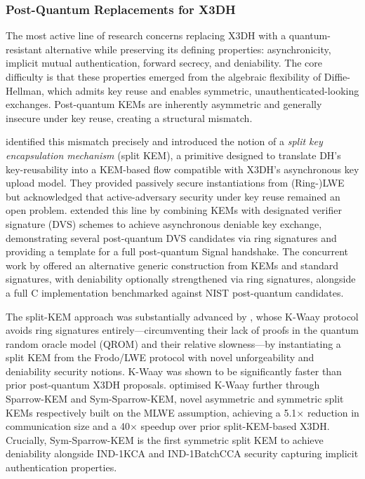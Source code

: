 \subsubsection{Post-Quantum Replacements for X3DH}

The most active line of research concerns replacing X3DH with a quantum-resistant alternative while preserving its defining properties: asynchronicity, implicit mutual authentication, forward secrecy, and deniability. The core difficulty is that these properties emerged from the algebraic flexibility of Diffie-Hellman, which admits key reuse and enables symmetric, unauthenticated-looking exchanges. Post-quantum KEMs are inherently asymmetric and generally insecure under key reuse, creating a structural mismatch.

\textcite{brendel2021} identified this mismatch precisely and introduced the notion of a \emph{split key encapsulation mechanism} (split KEM), a primitive designed to translate DH's key-reusability into a KEM-based flow compatible with X3DH's asynchronous key upload model. They provided passively secure instantiations from (Ring-)LWE but acknowledged that active-adversary security under key reuse remained an open problem. \textcite{brendel2022} extended this line by combining KEMs with designated verifier signature (DVS) schemes to achieve asynchronous deniable key exchange, demonstrating several post-quantum DVS candidates via ring signatures and providing a template for a full post-quantum Signal handshake. The concurrent work by \textcite{hashimoto2021,hashimoto2022} offered an alternative generic construction from KEMs and standard signatures, with deniability optionally strengthened via ring signatures, alongside a full C implementation benchmarked against NIST post-quantum candidates.

The split-KEM approach was substantially advanced by \textcite{collins2024b}, whose K-Waay protocol avoids ring signatures entirely—circumventing their lack of proofs in the quantum random oracle model (QROM) and their relative slowness—by instantiating a split KEM from the Frodo/LWE protocol with novel unforgeability and deniability security notions. K-Waay was shown to be significantly faster than prior post-quantum X3DH proposals. \textcite{niot2025} optimised K-Waay further through Sparrow-KEM and Sym-Sparrow-KEM, novel asymmetric and symmetric split KEMs respectively built on the MLWE assumption, achieving a 5.1$\times$ reduction in communication size and a 40$\times$ speedup over prior split-KEM-based X3DH. Crucially, Sym-Sparrow-KEM is the first symmetric split KEM to achieve deniability alongside IND-1KCA and IND-1BatchCCA security capturing implicit authentication properties.

